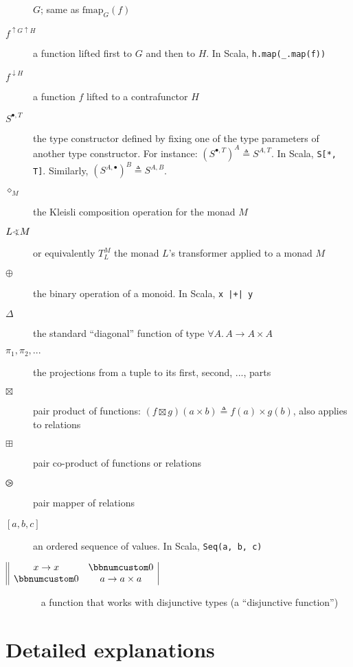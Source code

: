 \begin{description}
$G$; same as $\text{fmap}_{G}(f)$
\item [{$f^{\uparrow G\uparrow H}$}] \textemdash{} a function lifted first
to $G$ and then to $H$. In Scala, \lstinline!h.map(_.map(f))! 
\item [{$f^{\downarrow H}$}] \textemdash{} a function $f$ lifted to a
contrafunctor $H$ 
\item [{$S^{\bullet,T}$}] \textemdash{} the type constructor defined by
fixing one of the type parameters of another type constructor. For
instance: $(S^{\bullet,T})^{A}\triangleq S^{A,T}$. In Scala, \lstinline!S[*, T]!.
Similarly, $(S^{A,\bullet})^{B}\triangleq S^{A,B}$. 
\item [{$\diamond_{M}$}] \textemdash{} the Kleisli composition operation
for the monad $M$
\item [{$L\varangle M$}] or equivalently $T_{L}^{M}$ \textemdash{} the
monad $L$\textsf{'}s transformer applied to a monad $M$
\item [{$\oplus$}] \textemdash{} the binary operation of a monoid. In
Scala, \lstinline!x |+| y!
\item [{$\Delta$}] \textemdash{} the standard \textsf{``}diagonal\textsf{''} function
of type $\forall A.\,A\rightarrow A\times A$
\item [{$\pi_{1},\pi_{2},...$}] \textemdash{} the projections from a tuple
to its first, second, ..., parts
\item [{$\boxtimes$}] \textemdash{} pair product of functions: $(f\boxtimes g)(a\times b)\triangleq f(a)\times g(b)$,
also applies to relations
\item [{$\boxplus$}] \textemdash{} pair co-product of functions or relations
\item [{$\ogreaterthan$}] \textemdash{} pair mapper of relations
\item [{$\left[a,b,c\right]$}] \textemdash{} an ordered sequence of values.
In Scala, \lstinline!Seq(a, b, c)!
\item [{$\begin{array}{||cc|}
x\rightarrow x & \bbnum 0\\
\bbnum 0 & a\rightarrow a\times a
\end{array}$}] ~ \textemdash{} a function that works with disjunctive types
(a \textsf{``}disjunctive function\textsf{''})
\end{description}

\section{Detailed explanations}

